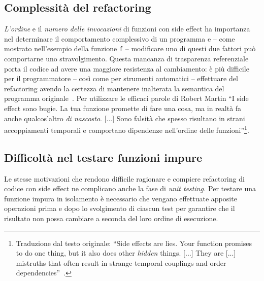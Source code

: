 \subsection{Complessità del refactoring}
\label{subsection:complessita-del-refactoring}
\emph{L'ordine} e il \emph{numero delle invocazioni} di funzioni con side effect ha importanza nel determinare il comportamento complessivo di un programma e -- come mostrato nell'esempio della funzione \lstinline{f} -- modificare uno di questi due fattori può comportarne uno stravolgimento.
Questa mancanza di trasparenza referenziale porta il codice ad avere una maggiore resistenza al cambiamento: è più difficile per il programmatore -- così come per strumenti automatici -- effettuare del refactoring avendo la certezza di mantenere inalterata la semantica del programma originale~\cite{cit:towards-purity-guided-refactoring-in-java}.
Per utilizzare le efficaci parole di Robert Martin ``I side effect sono bugie. La tua funzione promette di fare una cosa, ma in realtà fa anche qualcos'altro \emph{di nascosto}. [...] Sono falsità che spesso risultano in strani accoppiamenti temporali e comportano dipendenze nell'ordine delle funzioni''\footnote{Traduzione dal testo originale: ``Side effects are lies. Your function promises to do one thing, but it also does other \emph{hidden} things. [...] They are [...] mistruths that often result in strange temporal couplings and order dependencies''~\cite[p.~44]{cit:clean-code-a-handbook-of-agile-software-craftsmanship}.}.

\subsection{Difficoltà nel testare funzioni impure}
\label{subsection:difficolta-nel-testare-funzioni-impure}
Le stesse motivazioni che rendono difficile ragionare e compiere refactoring di codice con side effect ne complicano anche la fase di \emph{unit testing.}
Per testare una funzione impura in isolamento è necessario che vengano effettuate apposite operazioni prima e dopo lo svolgimento di ciascun test per garantire che il risultato non possa cambiare a seconda del loro ordine di esecuzione.

